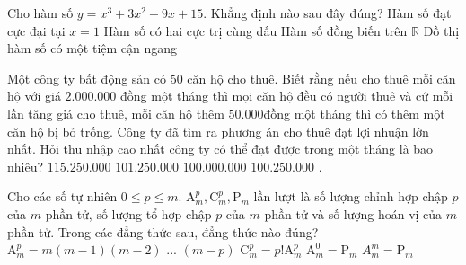 \begin{ex}%
Cho hàm số $y=x^3+3x^2-9x+15$. Khẳng định nào sau đây đúng?
\choice
{Hàm số đạt cực đại tại $x=1$}
{\True Hàm số có hai cực trị cùng dấu}
{Hàm số đồng biến trên $\mathbb{R}$}
{Đồ thị hàm số có một tiệm cận ngang}
\end{ex}
\begin{ex}%
Một công ty bất động sản có $50$ căn hộ cho thuê. Biết rằng nếu cho thuê mỗi căn hộ với giá $2.000.000$ đồng một tháng thì mọi căn hộ đều có người thuê và cứ mỗi lần tăng giá cho thuê, mỗi căn hộ thêm $50.000$đồng một tháng thì có thêm một căn hộ bị bỏ trống. Công ty đã tìm ra phương án cho thuê đạt lợi nhuận lớn nhất. Hỏi thu nhập cao nhất công ty có thể đạt được trong một tháng là bao nhiêu?
\choice
{$115.250.000$}
{\True $101.250.000$}
{$100.000.000$}
{$100.250.000$}
.
\end{ex}
\begin{ex}%
Cho các số tự nhiên $0\le p\le m$. $\mathrm{A}_m^p,\mathrm{C}_m^p,\mathrm{P}_m$ lần lượt là số lượng chỉnh hợp chập $p$ của $m$ phần tử, số lượng tổ hợp chập $p$ của $m$ phần tử và số lượng hoán vị của $m$ phần tử. Trong các đẳng thức sau, đẳng thức nào đúng?
\choice
{$\mathrm{A}_m^p=m(m-1)(m-2)\,\,...\,\,(m-p)$}
{$\mathrm{C}_m^p=p!\mathrm{A}_m^p$}
{$\mathrm{A}_m^0=\mathrm{P}_m$}
{\True $A_{m}^{m}=\mathrm{P}_m$}
\end{ex}
